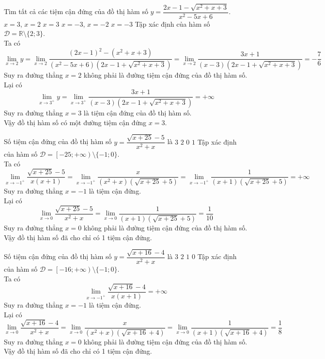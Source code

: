 \begin{ex}%
	Tìm tất cả các tiệm cận đứng của đồ thị hàm số $ y=\dfrac{2x-1-\sqrt{x^2+x+3}}{x^2-5x+6} $.
	\choice
	{$ x=3 $, $ x=2 $}
	{\True $ x=3 $}
	{$ x=-3 $, $ x=-2 $}
	{$ x=-3 $}
	\loigiai
	{
		Tập xác định của hàm số $ \mathscr{D} = \mathbb{R} \setminus \{2;3\}$.\\
		Ta có 
		\[\lim \limits_{x \to 2} y=\lim \limits_{x \to 2} \dfrac{(2x-1)^2-(x^2+x+3)}{\left(x^2-5x+6\right)\left(2x-1+\sqrt{x^2+x+3}\right)} = \lim \limits_{x \to 2} \dfrac{3x+1}{\left(x-3\right)\left(2x-1+\sqrt{x^2+x+3}\right)}=-\dfrac{7}{6}\]
		Suy ra đường thẳng $ x=2 $ không phải là đường tiệm cận đứng của đồ thị hàm số.\\
		Lại có 
		\[\lim \limits_{x \to 3^{+}} y=\lim \limits_{x \to 3^{+}} \dfrac{3x+1}{\left(x-3\right)\left(2x-1+\sqrt{x^2+x+3}\right)}=+\infty\]
		Suy ra đường thẳng $ x=3 $ là tiệm cận đứng của đồ thị hàm số.\\
		Vậy đồ thị hàm số có một đường tiệm cận đứng $ x=3 $.
	}
\end{ex}
\begin{ex}%
	Số tiệm cận đứng của đồ thị hàm số $ y=\dfrac{\sqrt{x+25}-5}{x^2+x} $ là 
	\choice
	{$ 3 $}
	{$ 2 $}
	{$ 0 $}
	{\True $ 1 $}
	\loigiai
	{
		Tập xác định của hàm số $ \mathscr{D} = \left[-25;+\infty\right) \setminus \{-1;0\}$.\\
		Ta có 
		\[\lim \limits_{x \to -1^{+}} \dfrac{\sqrt{x+25}-5}{x(x+1)}=\lim \limits_{x \to -1^{+}} \dfrac{x}{\left(x^2+x\right)\left(\sqrt{x+25}+5\right)} = \lim \limits_{x \to -1^{+}} \dfrac{1}{(x+1)\left(\sqrt{x+25}+5\right)}=+\infty\]
		Suy ra đường thẳng $ x=-1 $ là tiệm cận đứng.\\
		Lại có 
		\[\lim \limits_{x \to 0} \dfrac{\sqrt{x+25}-5}{x^2+x}=\lim \limits_{x \to 0} \dfrac{1}{(x+1)\left(\sqrt{x+25}+5\right)}=\dfrac{1}{10}\]
		Suy ra đường thẳng $ x=0 $ không phải là đường tiệm cận đứng của đồ thị hàm số.\\
		Vậy đồ thị hàm số đã cho chỉ có 1 tiệm cận đứng.
	}
\end{ex}
\begin{ex}%
	Số tiệm cận đứng của đồ thị hàm số $ y=\dfrac{\sqrt{x+16}-4}{x^2+x} $ là
	\choice
	{$ 3 $}
	{$ 2 $}
	{\True $ 1 $}
	{$ 0 $}
	\loigiai
	{
		Tập xác định của hàm số $ \mathscr{D} = \left[-16;+\infty\right) \setminus \{-1;0\}$.\\
		Ta có 
		\[\lim \limits_{x \to -1^{+}} \dfrac{\sqrt{x+16}-4}{x(x+1)}=+\infty\]
		Suy ra đường thẳng $ x=-1 $ là tiệm cận đứng.\\
		Lại có 
		\[\lim \limits_{x \to 0} \dfrac{\sqrt{x+16}-4}{x^2+x}=\lim \limits_{x \to 0} \dfrac{x}{\left(x^2+x\right)\left(\sqrt{x+16}+4\right)} = \lim \limits_{x \to 0} \dfrac{1}{(x+1)\left(\sqrt{x+16}+4\right)}=\dfrac{1}{8}\]
		Suy ra đường thẳng $ x=0 $ không phải là đường tiệm cận đứng của đồ thị hàm số.\\
		Vậy đồ thị hàm số đã cho chỉ có 1 tiệm cận đứng.
	}
\end{ex}
